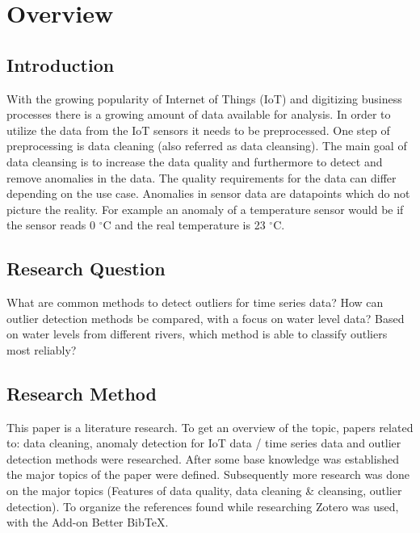 \chapter{Overview}

\section{Introduction}\label{section:introduction}
With the growing popularity of Internet of Things (\ac{IoT}) and digitizing business processes there is a growing amount of data available for analysis.
In order to utilize the data from the IoT sensors it needs to be preprocessed. One step of preprocessing is data cleaning (also referred as data cleansing).
The main goal of data cleansing is to increase the data quality and furthermore to detect and remove anomalies in the data. The quality requirements for the data can differ depending on the use case. Anomalies in sensor data are datapoints which do not picture the reality. For example an anomaly of a temperature sensor would be if the sensor reads 0 $^{\circ}$C and the real temperature is 23 $^{\circ}$C.

\section{Research Question}
What are common methods to detect outliers for time series data? \newline
How can outlier detection methods be compared, with a focus on water level data? \newline
Based on water levels from different rivers, which method is able to classify outliers most reliably?


\section{Research Method}
This paper is a literature research. To get an overview of the topic, papers related to: data cleaning, anomaly detection for IoT data / time series data and outlier detection methods were researched. After some base knowledge was established the major topics of the paper were defined. Subsequently more research was done on the major topics (Features of data quality, data cleaning \& cleansing, outlier detection). To organize the references found while researching Zotero was used, with the Add-on Better BibTeX. 
